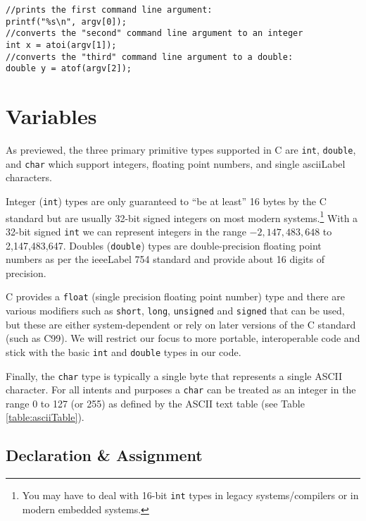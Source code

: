 \begin{verbatim}
//prints the first command line argument:
printf("%s\n", argv[0]);
//converts the "second" command line argument to an integer
int x = atoi(argv[1]);  
//converts the "third" command line argument to a double:
double y = atof(argv[2]);
\end{verbatim}

\section{Variables}

As previewed, the three primary primitive types supported in C are \texttt{int},
\texttt{double}, and \texttt{char} which support integers, floating point
numbers, and single \gls{asciiLabel} characters.  

Integer (\texttt{int}) types are only guaranteed to ``be at least'' 16 bytes by
the C standard but are usually 32-bit signed integers on most modern 
systems.\footnote{You may have to deal with 16-bit \texttt{int} types 
in legacy systems/compilers or in modern embedded systems.}  With a  32-bit signed 
\texttt{int} we can represent integers in the range $-2,147,483,648$ to 
2,147,483,647.  Doubles (\texttt{double}) types are double-precision 
floating point numbers as per the \gls{ieeeLabel} 754 standard and provide about 16 digits
of precision.  

C provides a \texttt{float} (single precision floating point 
number) type and there are various modifiers such as \texttt{short}, \texttt{long}, 
\texttt{unsigned} and \texttt{signed} that can be used, but these
are either system-dependent or rely on later versions of the C standard (such as
C99).  We will restrict our focus to more portable, interoperable code and stick
with the basic \texttt{int} and \texttt{double} types in 
our code.

Finally, the \texttt{char} type is typically a single byte that represents a
single ASCII character.  For all intents and purposes a \texttt{char} can 
be treated as an integer in the range 0 to 127 (or 255) as defined by the
ASCII text table (see Table \ref{table:asciiTable}).

\subsection{Declaration \& Assignment}

